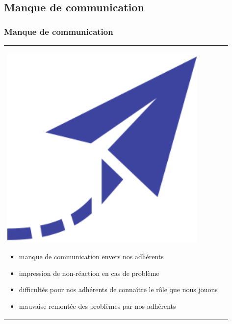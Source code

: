 \documentclass[handout]{beamer}
\begin{document}
	\subsection{Manque de communication}
		\begin{frame}
		\frametitle{Manque de communication}

		\begin{tabular}{l l}
			\begin{minipage}{0.2\textwidth}
				\begin{center}
					\includegraphics[width=0.9\textwidth]{images/communication.png}
				\end{center}
			\end{minipage}

			\begin{minipage}{0.8\textwidth}
				\begin{itemize}
					\item manque de communication envers nos adhérents
					\item impression de non-réaction en cas de problème
					\item difficultés pour nos adhérents de connaître le rôle que nous jouons
					\item mauvaise remontée des problèmes par nos adhérents
				\end{itemize}
			\end{minipage}
			
		\end{tabular}
		\end{frame}
\end{document}
